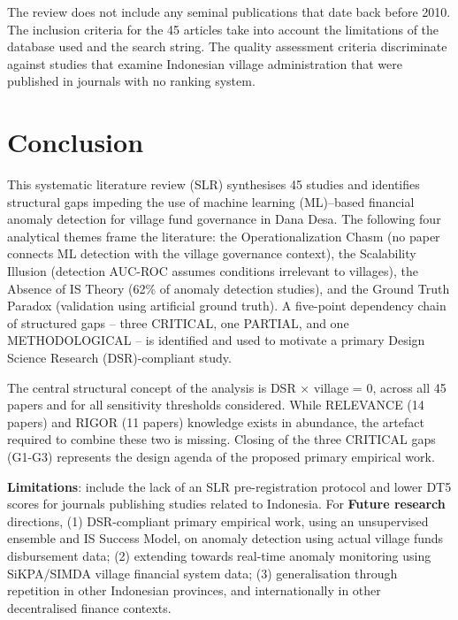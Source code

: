 \documentclass[3p,times,procedia]{elsarticle}
\begin{document}
The review does not include any seminal publications that date back before 2010. The inclusion criteria for the 45 articles take into account the limitations of the database used and the search string. The quality assessment criteria discriminate against studies that examine Indonesian village administration that were published in journals with no ranking system.

\section{Conclusion}
\label{sec:conclusion}

This systematic literature review (SLR) synthesises 45 studies and identifies structural gaps impeding the use of machine learning (ML)–based financial anomaly detection for village fund governance in Dana Desa. The following four analytical themes frame the literature: the Operationalization Chasm (no paper connects ML detection with the village governance context), the Scalability Illusion (detection AUC-ROC assumes conditions irrelevant to villages), the Absence of IS Theory (62\% of anomaly detection studies), and the Ground Truth Paradox (validation using artificial ground truth). A five-point dependency chain of structured gaps – three CRITICAL, one PARTIAL, and one METHODOLOGICAL – is identified and used to motivate a primary Design Science Research (DSR)-compliant study.

The central structural concept of the analysis is DSR × village = 0, across all 45 papers and for all sensitivity thresholds considered. While RELEVANCE (14 papers) and RIGOR (11 papers) knowledge exists in abundance, the artefact required to combine these two is missing. Closing of the three CRITICAL gaps (G1-G3) represents the design agenda of the proposed primary empirical work.

\textbf{Limitations}: include the lack of an SLR pre-registration protocol and lower DT5 scores for journals publishing studies related to Indonesia. For \textbf{Future research} directions, (1) DSR-compliant primary empirical work, using an unsupervised ensemble and IS Success Model, on anomaly detection using actual village funds disbursement data; (2) extending towards real-time anomaly monitoring using SiKPA/SIMDA village financial system data; (3) generalisation through repetition in other Indonesian provinces, and internationally in other decentralised finance contexts.
\end{document}

